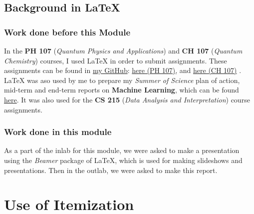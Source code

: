 \documentclass[12pt]{report}
\begin{document}
\section{Background in \LaTeX{}}
\subsection{Work done before this Module}
In the \textbf{PH 107} (\textit{Quantum Physics and Applications}) and \textbf{CH 107} (\textit{Quantum Chemistry}) courses, I used \LaTeX{} in order to submit
assignments. These assignments can be found in \href{https://github.com/AshwinAbraham2021}{my GitHub}: \href{https://github.com/AshwinAbraham2021/PH107-Resources}{here (PH 107)}, and
\href{https://github.com/AshwinAbraham2021/CH107-Resources}{here (CH 107)} \cite{github}. \LaTeX{} was aso used by me to prepare my \textit{Summer of Science} plan of action, mid-term and end-term reports on \textbf{Machine Learning},
which can be found \href{https://github.com/AshwinAbraham2021/SOS-Machine-Learning}{here}. It was also used for the \textbf{CS 215} (\textit{Data Analysis and Interpretation}) course assignments.
\subsection{Work done in this module}
As a part of the inlab for this module, we were asked to make a presentation using the \textit{Beamer} package
of \LaTeX{}, which is used for making slideshows and presentations. Then in the outlab, we were asked to make this report.


\chapter{Use of Itemization\cite{wikisort}}
\end{document}
